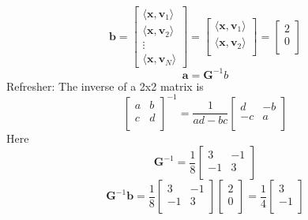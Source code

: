 \documentclass[12pt]{article}
\begin{document}
\begin{equation*}
    \mathbf{b} = 
    \begin{bmatrix}
        \langle \mathbf{x},\mathbf{v}_1 \rangle  \\ 
        \langle \mathbf{x},\mathbf{v}_2 \rangle  \\ 
        \vdots \\
        \langle \mathbf{x},\mathbf{v}_N \rangle 
    \end{bmatrix}
    =
    \begin{bmatrix}
        \langle \mathbf{x},\mathbf{v}_1 \rangle  \\ 
        \langle \mathbf{x},\mathbf{v}_2 \rangle  \\  
    \end{bmatrix}
    =
    \begin{bmatrix}
        2 \\
        0 \\
    \end{bmatrix}
\end{equation*}
\begin{equation*}
    \mathbf{a} = \mathbf{G}^{-1} b
\end{equation*}
Refresher: The inverse of a 2x2 matrix is 
\begin{equation*}
    \begin{bmatrix}
        a & b \\
        c & d \\
    \end{bmatrix}^{-1}
    = \frac{1}{ad-bc} 
    \begin{bmatrix}
        d & -b \\
        -c & a \\
    \end{bmatrix}
\end{equation*}
Here
\begin{equation*}
    \mathbf{G}^{-1}
    = \frac{1}{8} 
    \begin{bmatrix}
        3 & -1 \\
        -1 & 3 \\
    \end{bmatrix}
\end{equation*}
\begin{equation*}
    \mathbf{G}^{-1} \mathbf{b}
    = \frac{1}{8} 
    \begin{bmatrix}
        3 & -1 \\
        -1 & 3 \\
    \end{bmatrix}
    \begin{bmatrix}
        2 \\
        0 \\
    \end{bmatrix}
    =
    \frac{1}{4} 
    \begin{bmatrix}
        3 \\
        -1 \\
    \end{bmatrix}
\end{equation*}
\end{document}

